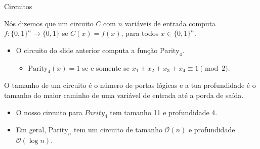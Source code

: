 \documentclass[landscape]{beamer}
\newcommand{\binalph}{\{0, 1\}}
\newcommand{\Parity}{\text{Parity}}
\begin{document}
\begin{frame} {Circuitos}

Nós dizemos que um circuito $C$ com $n$ variáveis de entrada computa $f: \binalph^{n} \to \binalph$ se $C(x) = f(x)$, para todos $x \in \binalph^{n}$.

\begin{itemize}

	\item O circuito do slide anterior computa a função $\Parity_{4}$.
	
	\begin{itemize}
	
		\item $\Parity_{4}(x) = 1$ se e somente se $x_{1} + x_{2} + x_{3} + x_{4} \equiv 1 \pmod{2}$.
		
	\end{itemize}

\end{itemize}

O tamanho de um circuito é o número de portas lógicas e a tua profundidade é o tamanho do maior caminho de uma variável de entrada até a porda de saída.

\begin{itemize}

	\item O nosso circuito para $Parity_{4}$ tem tamanho 11 e profundidade 4.
	
	\item Em geral, $\Parity_{n}$ tem um circuito de tamanho $\mathcal{O}(n)$ e profundidade $\mathcal{O}(\log n)$.

\end{itemize}

\end{frame}

\end{document}

